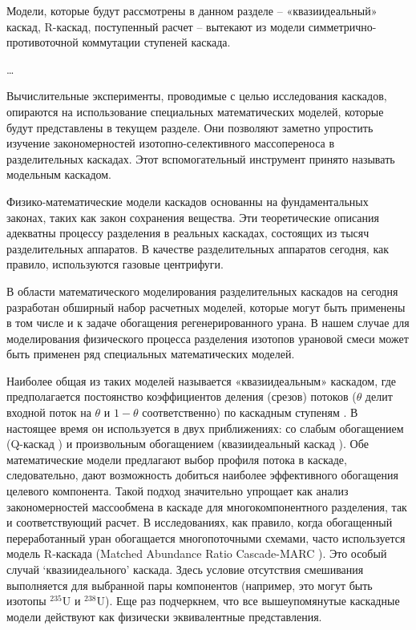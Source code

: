 Модели, которые будут рассмотрены в данном разделе -- «квазиидеальный» каскад, R-каскад, поступенный расчет -- вытекают из модели симметрично-противоточной коммутации ступеней каскада.

\dots

Вычислительные эксперименты, проводимые с целью исследования каскадов, опираются на использование специальных математических моделей, которые будут представлены в текущем разделе. Они позволяют заметно упростить изучение закономерностей изотопно-селективного массопереноса в разделительных каскадах. Этот вспомогательный инструмент принято называть модельным каскадом.

Физико-математические модели каскадов основанны на фундаментальных законах, таких как закон сохранения вещества.
Эти теоретические описания адекватны процессу разделения в реальных каскадах, состоящих из тысяч разделительных аппаратов.
В качестве разделительных аппаратов сегодня, как правило, используются газовые центрифуги.

В области математического моделирования разделительных каскадов на сегодня разработан обширный набор расчетных моделей, которые могут быть применены в том числе и к задаче обогащения регенерированного урана.
В нашем случае для моделирования физического процесса разделения изотопов урановой смеси может быть применен ряд специальных математических моделей.

Наиболее общая из таких моделей называется «квазиидеальным» каскадом, где предполагается постоянство коэффициентов деления (срезов) потоков ($\theta$ делит входной поток на $\theta$ и $1 - \theta$ соответственно) по каскадным ступеням \cite{yamamotoMulticomponentIsotopeSeparating1978}. В настоящее время он используется в двух приближениях: со слабым обогащением (Q-каскад \cite{borisevichNewApproachOptimize2011, kolokoltsovDesignCascadesSeparating1970, zengQCascadeExplanation2012}) и произвольным обогащением (квазиидеальный каскад \cite{sulaberidzeSpecialFeaturesEnrichment2006}).
Обе математические модели предлагают выбор профиля потока в каскаде, следовательно, дают возможность добиться наиболее эффективного обогащения целевого компонента.
Такой подход значительно упрощает как анализ закономерностей массообмена в каскаде для многокомпонентного разделения, так и соответствующий расчет.
В исследованиях, как правило, когда обогащенный переработанный уран обогащается многопоточными схемами, часто используется модель R-каскада (Matched Abundance Ratio Cascade-MARC \cite{delagarzaMulticomponentIsotopeSeparation1961, woodEffectsSeparationProcesses2008, kazukihidaSimultaneousEvaluationEffects}). Это особый случай `квазиидеального' каскада. Здесь условие отсутствия смешивания выполняется для выбранной пары компонентов (например, это могут быть изотопы $^{235}$U и $^{238}$U). Еще раз подчеркнем, что все вышеупомянутые каскадные модели действуют как физически эквивалентные представления.


